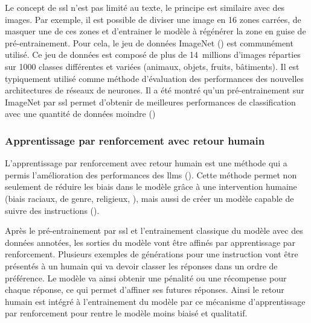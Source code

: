 Le concept de \gls{ssl} n'est pas limité au texte, le principe est similaire avec des images. Par exemple, il est possible de diviser une image en 16 zones carrées, de masquer une de ces zones et d'entrainer le modèle à régénérer la zone en guise de pré-entrainement. Pour cela, le jeu de données ImageNet (\cite{deng_imagenet_2009}) est communément utilisé. Ce jeu de données est composé de plus de 14~millions d'images réparties sur 1000 classes différentes et variées (animaux, objets, fruits, bâtiments). Il est typiquement utilisé comme méthode d'évaluation des performances des nouvelles architectures de réseaux de neurones. Il a été montré qu'un pré-entrainement sur ImageNet par \gls{ssl} permet d'obtenir de meilleures performances de classification avec une quantité de données moindre (\cite{goyal_self-supervised_2021})

\subsubsection{Apprentissage par renforcement avec retour humain}
L'apprentissage par renforcement avec retour humain est une méthode qui a permis l'amélioration des performances des \gls{llms} (\cite{ziegler_fine-tuning_2020, stiennon_learning_2020}). Cette méthode permet non seulement de réduire les biais dans le modèle grâce à une intervention humaine (biais raciaux, de genre, religieux, \cite{ganguli_red_2022}), mais aussi de créer un modèle capable de suivre des instructions (\cite{ouyang_training_2022}).


Après le pré-entrainement par \gls{ssl} et l'entrainement classique du modèle avec des données annotées, les sorties du modèle vont être affinés par apprentissage par renforcement. Plusieurs exemples de générations pour une instruction vont être présentés à un humain qui va devoir classer les réponses dans un ordre de préférence. Le modèle va ainsi obtenir une pénalité ou une récompense pour chaque réponse, ce qui permet d'affiner ses futures réponses. Ainsi le retour humain est intégré à l'entrainement du modèle par ce mécanisme d'apprentissage par renforcement pour rentre le modèle moins biaisé et qualitatif.

